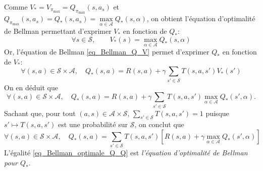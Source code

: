 Comme $V_*=V_{\pi_{\max}}=Q_{\pi_{\max}}(s,a_s)$ et $Q_{\pi_{\max}}(s,a_s)=Q_{*}(s,a_s)=\mathop{\max}\limits_{\alpha\in\mathcal{A}} Q_*(s,\alpha)$, on obtient l'équation d'optimalité de Bellman permettant d'exprimer $V_*$ en fonction de $Q_*$:
\begin{equation}
\forall s\in\mathcal{S}, \qquad V_*(s)=\max_{\alpha\in\mathcal{A}} Q_*(s,\alpha)
\label{eq_Bellman_optimal_V_Q}
\end{equation}
Or, l'équation de Bellman \eqref{eq_Bellman_Q_V} permet d'exprimer $Q_*$ en fonction de $V_*$:
\begin{equation}
\forall (s,a)\in\mathcal{S}\times\mathcal{A}, \quad Q_*(s,a)=R(s,a)+\gamma \sum_{s'\in\mathcal{S}} T(s,a,s')V_*(s')
\end{equation}
On en déduit que 
$$\forall (s,a)\in\mathcal{S}\times\mathcal{A}, \quad Q_*(s,a) = R(s,a) + \gamma \sum_{s'\in\mathcal{S}} T(s,a,s')\max_{\alpha \in \mathcal{A}} Q_{*}(s',\alpha).$$
Sachant que, pour tout $(a,s)\in\mathcal{A}\times\mathcal{S}$, $\sum\limits_{s'\in\mathcal{S}} T(s,a,s')=1$ puisque $s' \mapsto T(s,a,s')$ est une probabilité sur $\mathcal{S}$, on conclut que
\begin{equation} \forall (s,a)\in\mathcal{S}\times\mathcal{A}, \quad Q_*(s,a) = \sum_{s'\in\mathcal{S}} T(s,a,s') \left[R(s,a) + \gamma \max_{\alpha \in \mathcal{A}} Q_{*}(s',\alpha)\right] \label{eq_Bellman_optimale_Q_Q}
\end{equation}
L'égalité \eqref{eq_Bellman_optimale_Q_Q} est \textit{l'équation d'optimalité de Bellman pour $Q_*$}.








